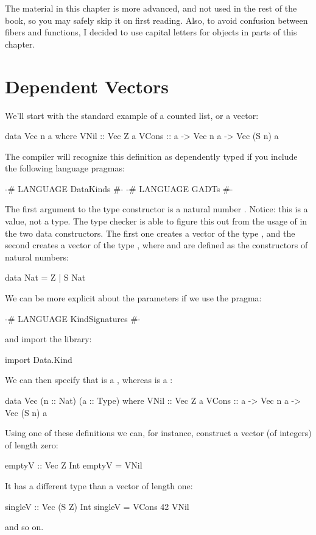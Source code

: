 \documentclass[DaoFP]{subfiles}
\begin{document}
The material in this chapter is more advanced, and not used in the rest of the book, so you may safely skip it on first reading. Also, to avoid confusion between fibers and functions, I decided to use capital letters for objects in parts of this chapter.

\section{Dependent Vectors}

We'll start with the standard example of a counted list, or a vector:
\begin{haskell}
data Vec n a where
    VNil  :: Vec Z a
    VCons :: a -> Vec n a -> Vec (S n) a
\end{haskell}
The compiler will recognize this definition as dependently typed if you include the following language pragmas:
\begin{haskell}
{-# LANGUAGE DataKinds #-}
{-# LANGUAGE GADTs #-}
\end{haskell}
The first argument to the type constructor is a natural number . Notice: this is a value, not a type. The type checker is able to figure this out from the usage of  in the two data constructors. The first one creates a vector of the type , and the second creates a vector of the type , where  and  are defined as the constructors of natural numbers:
\begin{haskell}
data Nat = Z | S Nat
\end{haskell}

We can be more explicit about the parameters if we use the pragma:
\begin{haskell}
{-# LANGUAGE KindSignatures #-}
\end{haskell}
and import the library:
\begin{haskell}
import Data.Kind
\end{haskell}
We can then specify that  is a , whereas  is a :
\begin{haskell}
data Vec (n :: Nat) (a :: Type) where
    VNil  :: Vec Z a
    VCons :: a -> Vec n a -> Vec (S n) a
\end{haskell}

Using one of these definitions we can, for instance, construct a vector (of integers) of length zero:
\begin{haskell}
emptyV :: Vec Z Int
emptyV = VNil
\end{haskell}
It has a different type than a vector of length one:
\begin{haskell}
singleV :: Vec (S Z) Int
singleV = VCons 42 VNil
\end{haskell}
and so on.
\end{document}
